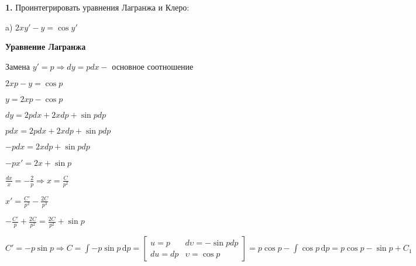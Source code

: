 \documentclass[a4paper]{article}
\begin{document}
\vspace{0.5cm}

\textbf{1.} Проинтегрировать уравнения Лагранжа и Клеро:

\vspace{1cm}

a) $\displaystyle 2xy'-y=\cos{y'}$

\vspace{0.3cm}

\textbf{Уравнение Лагранжа}

\vspace{0.3cm}

Замена $\displaystyle y'=p \Rightarrow dy=pdx - $ основное соотношение

\vspace{0.3cm}

$\displaystyle 2xp-y=\cos{p}$

\vspace{0.3cm}

$\displaystyle y=2xp-\cos{p}$

\vspace{0.3cm}

$\displaystyle dy=2pdx+2xdp+\sin{p}dp$

\vspace{0.3cm}

$\displaystyle pdx=2pdx+2xdp+\sin{p}dp$

\vspace{0.3cm}

$\displaystyle -pdx=2xdp+\sin{p}dp$

\vspace{0.3cm}

$\displaystyle -px'=2x+\sin{p}$

\vspace{0.3cm}

$\displaystyle \frac{dx}{x}=-\frac{2}{p} \Rightarrow x=\frac{C}{p^2}$

\vspace{0.3cm}

$\displaystyle x'=\frac{C'}{p^2}-\frac{2C}{p^3}$

\vspace{0.3cm}

$\displaystyle -\frac{C'}{p}+\frac{2C}{p^2}=\frac{2C}{p^2}+\sin{p}$

\vspace{0.3cm}

$\displaystyle C'=-p\sin{p} \Rightarrow C=\int -p\sin{p}\, \mathrm{d}p=\begin{bmatrix}
       u=p & d\upsilon=-\sin{p}dp           \\[0.3em]
       du=dp & \upsilon=\cos{p}           
     \end{bmatrix}=p\cos{p}-\int \cos{p}\, \mathrm{d}p=p\cos{p}-\sin{p}+C_1$
\end{document}
